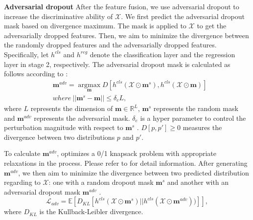 \textbf{Adversarial dropout} After the feature fusion, we use adversarial dropout \cite{park2018adversarial, lee2019drop} to increase the discriminative ability of $\mathcal{X}$.
We first predict the adversarial dropout mask based on divergence maximum. The mask is applied to $\mathcal{X}$ to get the adversarially dropped features.
Then, we aim to minimize the divergence between the randomly dropped features and the adversarially dropped features.
Specifically, let $h^{cls}$ and $h^{reg}$ denote the classification layer and the regression layer in stage 2, respectively.
The adversarial dropout mask is calculated as follows according to \cite{lee2019drop}:
\begin{equation}
\begin{split}
    & \mathbf{m}^{adv} = \mathop{\arg\max}\limits_{\mathbf{m}}D[h^{cls}(\mathcal{X} \odot \mathbf{m}^s), h^{cls}(\mathcal{X} \odot \mathbf{m})] \\
    & where~||\mathbf{m}^s - \mathbf{m}|| \leq \delta_e L,
\end{split}
\end{equation}
where $L$ represents the dimension of $\mathbf{m} \in \mathbb R^L$,
$\mathbf{m}^s$ represents the random mask and $\mathbf{m}^{adv}$ represents the adversarial mask.
$\delta_{e}$ is a hyper parameter to control the perturbation magnitude with respect to $\mathbf{m}^{s}$ \cite{lee2019drop}.
$D[p, p']  \geq 0$ measures the divergence between two distributions $p$ and $p'$.

To calculate $\mathbf{m}^{adv}$, \cite{park2018adversarial} optimizes a 0/1 knapsack problem with appropriate relaxations in the process. Please refer to \cite{park2018adversarial} for detail information.
After generating $\mathbf{m}^{adv}$, we then aim to minimize the divergence between two predicted distribution regarding to $\mathcal{X}$: one with a random dropout mask $\mathbf{m}^{s}$ and another with an adversarial dropout mask $\mathbf{m}^{adv}$ \cite{lee2019drop}.
\begin{equation}
    \mathcal{L}_{adv} = \mathbb E[D_{KL}[h^{cls}(\mathcal{X} \odot\mathbf{m}^{s})||h^{cls}(\mathcal{X} \odot\mathbf{m}^{adv}))]],
\end{equation}
where $D_{KL}$ is the Kullback-Leibler divergence.

